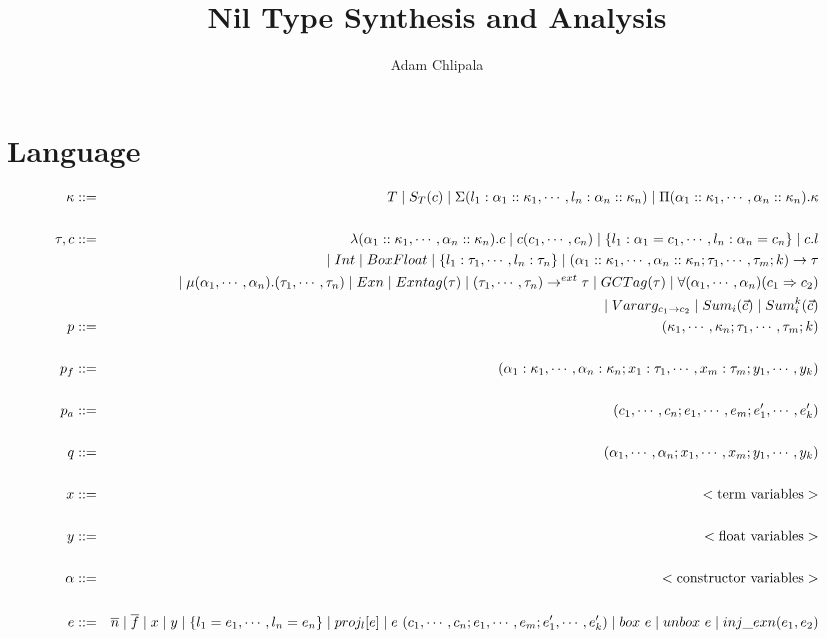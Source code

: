 \documentclass{article}
\title{Nil Type Synthesis and Analysis}
\author{Adam Chlipala}
\begin{document}
\maketitle

\section{Language}

\begin{eqnarray*}
	\kappa &::=& T \mid S_T(c) \mid \DRecord{l_1:\alpha_1::\kappa_1, \cdots, l_n:\alpha_n::\kappa_n} \mid \DArrow{\alpha_1::\kappa_1, \cdots, \alpha_n::\kappa_n}{\kappa} \\
	\\
	\tau, c &::=& \CFn{\alpha_1::\kappa_1,\cdots,\alpha_n::\kappa_n}{c} \mid \CApp{c}{c_1,\cdots,c_n} \mid \CRecord{l_1: \alpha_1 = c_1, \cdots, l_n: \alpha_n = c_n} \mid \CSelect{c}{l} \\
	&& \mid \TInt \mid \BoxFloat \mid \Record{l_1: \tau_1,\cdots,l_n: \tau_n} \mid \Arrow{\alpha_1::\kappa_1,\cdots,\alpha_n::\kappa_n}{\tau_1,\cdots,\tau_m}{k}{\tau} \\
	&& \mid \Rec{\alpha_1,\cdots,\alpha_n}{\tau_1,\cdots,\tau_n} \mid \Exn \mid \Exntag{\tau} \mid \ExternArrow{\tau_1,\cdots,\tau_n}{\tau} \mid \GCTag{\tau} \mid \Coercion{\alpha_1,\cdots,\alpha_n}{c_1}{c_2} \\
	&& \mid \Vararg{c_1}{c_2} \mid \Sum{i}{\vec c} \mid \KSum{i}{\vec c}{k}
	\\
	p &::=& (\kappa_1,\cdots,\kappa_n; \tau_1,\cdots,\tau_m; k) \\
	\\
	p_f &::=& (\alpha_1: \kappa_1,\cdots,\alpha_n: \kappa_n; x_1: \tau_1,\cdots,x_m: \tau_m; y_1, \cdots, y_k) \\
	\\
	p_a &::=& (c_1, \cdots, c_n; e_1, \cdots, e_m; e'_1, \cdots, e'_k) \\
	\\
	q &::=& (\alpha_1, \cdots, \alpha_n; x_1, \cdots, x_m; y_1, \cdots, y_k) \\
	\\
	x &::=& <\textrm{term variables}> \\
	\\
	y &::=& <\textrm{float variables}> \\
	\\
	\alpha &::=& <\textrm{constructor variables}> \\
	\\
	e &::=& \overline n \mid \overline f \mid x \mid y \mid \RecordIntro{l_1 = e_1,\cdots,l_n = e_n} \mid \Proj{l}{e} \mid \App{e}{c_1,\cdots,c_n}{e_1,\cdots,e_m}{e'_1,\cdots,e'_k} \mid \Boxf{e} \mid \Unboxf{e} \mid \Injexn{e_1}{e_2} \\

\end{eqnarray*}
\end{document}
